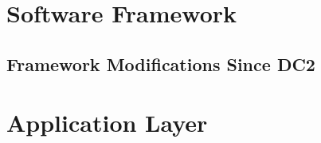 \documentclass[preprint]{aastex}
\begin{document}


\section{Software Framework}

\subsection{Framework Modifications Since DC2}













\section{Application Layer}


























\end{document}
